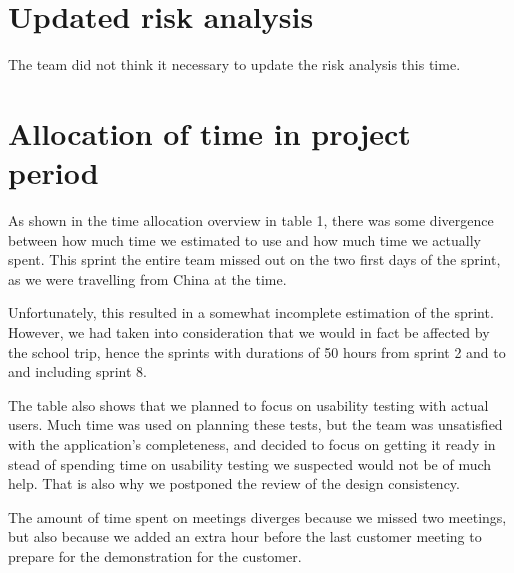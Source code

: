 \documentclass[12pt]{article}
\begin{document}
\section{Updated risk analysis}
The team did not think it necessary to update the risk analysis this time.


\section{Allocation of time in project period}
As shown in the time allocation overview in table 1, there was some divergence between how much time we estimated to use and how much time we actually spent. This sprint the entire team missed out on the two first days of the sprint, as we were travelling from China at the time. 

Unfortunately, this resulted in a somewhat incomplete estimation of the sprint. However, we had taken into consideration that we would in fact be affected by the school trip, hence the sprints with durations of 50 hours from sprint 2 and to and including sprint 8.

The table also shows that we planned to focus on usability testing with actual users. Much time was used on planning these tests, but the team was unsatisfied with the application's completeness, and decided to focus on getting it ready in stead of spending time on usability testing we suspected would not be of much help. That is also why we postponed the review of the design consistency.

The amount of time spent on meetings diverges because we missed two meetings, but also because we added an extra hour before the last customer meeting to prepare for the demonstration for the customer.
\end{document}
